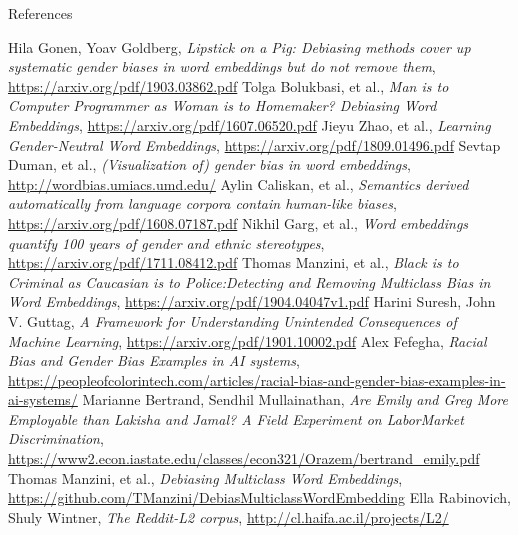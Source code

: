 \documentclass{beamer}
\begin{document}
	\begin{frame}[allowframebreaks]{References}
		\small{
				\begin{thebibliography}{10}
				
				 Hila Gonen, Yoav Goldberg, \textit{Lipstick on a Pig: Debiasing methods cover up systematic gender biases in word embeddings but do not remove them}, \url{https://arxiv.org/pdf/1903.03862.pdf}
				 Tolga Bolukbasi, et al., \textit{Man is to Computer Programmer as Woman is to Homemaker? Debiasing Word Embeddings}, \url{https://arxiv.org/pdf/1607.06520.pdf}
				 Jieyu Zhao, et al., \textit{Learning Gender-Neutral Word Embeddings}, \url{https://arxiv.org/pdf/1809.01496.pdf}
				 Sevtap Duman, et al., \textit{(Visualization of) gender bias in word embeddings}, \url{http://wordbias.umiacs.umd.edu/}
				Aylin Caliskan, et al., \textit{Semantics derived automatically from language corpora contain human-like biases}, \url{https://arxiv.org/pdf/1608.07187.pdf}
				Nikhil Garg, et al., \textit{Word embeddings quantify 100 years of gender and ethnic stereotypes}, \url{https://arxiv.org/pdf/1711.08412.pdf}
				 Thomas Manzini, et al., \textit{Black is to Criminal as Caucasian is to Police:Detecting and Removing Multiclass Bias in Word Embeddings}, \url{https://arxiv.org/pdf/1904.04047v1.pdf}
				 Harini Suresh, John V. Guttag, \textit{A Framework for Understanding Unintended Consequences of Machine Learning}, \url{https://arxiv.org/pdf/1901.10002.pdf}
				 Alex Fefegha, \textit{Racial Bias and Gender Bias Examples in AI systems}, \url{https://peopleofcolorintech.com/articles/racial-bias-and-gender-bias-examples-in-ai-systems/}
				Marianne Bertrand, Sendhil Mullainathan, \textit{Are Emily and Greg More Employable than Lakisha and Jamal? A Field Experiment on LaborMarket Discrimination}, \url{https://www2.econ.iastate.edu/classes/econ321/Orazem/bertrand_emily.pdf}
				 Thomas Manzini, et al., \textit{Debiasing Multiclass Word Embeddings}, \url{https://github.com/TManzini/DebiasMulticlassWordEmbedding}
				Ella Rabinovich, Shuly Wintner, \textit{The Reddit-L2 corpus}, \url{http://cl.haifa.ac.il/projects/L2/}
				
			\end{thebibliography}
		}
		
	\end{frame}
	
\end{document}
